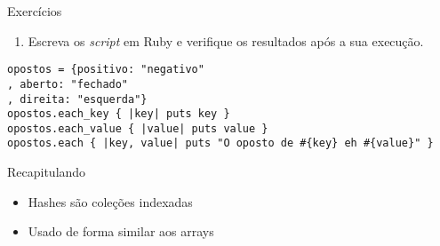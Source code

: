 \begin{frame}[fragile,t]{Exercícios}
  \begin{enumerate}
    \item Escreva os \textit{script} em Ruby e verifique os resultados após a sua execução.
  \end{enumerate}
	\begin{lstlisting}[style=RubyInputStyle]
opostos = {positivo: "negativo"
, aberto: "fechado"
, direita: "esquerda"}
opostos.each_key { |key| puts key }
opostos.each_value { |value| puts value }
opostos.each { |key, value| puts "O oposto de #{key} eh #{value}" } 
	\end{lstlisting}
\end{frame}

\begin{frame}[fragile,t]{Recapitulando}
  \begin{itemize}
    \item Hashes são \alert{coleções indexadas}
    \item Usado de forma \alert{similar aos arrays}
  \end{itemize}
\end{frame}



